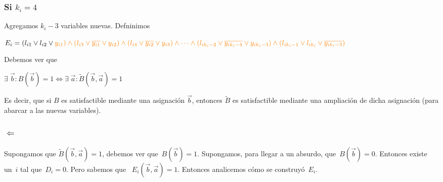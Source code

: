 \documentclass[10pt,a4paper]{article}
\begin{document}
\subsubsection*{Si $k_i = 4$}

Agregamos $k_i - 3$ variables nuevas. Defninimos

\begin{center}
$E_i = (l_{i1} \lor l_{i2}\lor \color{orange}{y_{i1}}) \land (l_{i3} \lor \color{orange}{\overline{y_{i1}}}\lor \color{orange}{y_{i2}}) \land (l_{i4} \lor \color{orange}{\overline{y_{i2}}}\lor \color{orange}{y_{i3}}) \land \dots \land (l_{ik_{i}-2} \lor \color{orange}{\overline{y_{ik_{i}-4}}}\lor \color{orange}{y_{ik_{i}-3}}) \land (l_{ik_{i}-1} \lor l_{ik_i}\lor \color{orange}{\overline{y_{ik_{i}-3}}})$
\end{center}

Debemos ver que

\begin{center}
$\exists \; \overrightarrow{b} :B(\overrightarrow{b}) = 1 \Leftrightarrow \exists \; \overrightarrow{a} : \tilde B(\overrightarrow{b}, \overrightarrow{a}) = 1$
\end{center}

Es decir, que si $B$ es satisfactible mediante una asignación $\overrightarrow{b} $, entonces $\tilde B$ es satisfactible mediante una ampliación de dicha asignación (para abarcar a las nuevas variables).

\subsubsection*{$\Leftarrow$}

Supongamos que $\tilde B(\overrightarrow{b} , \overrightarrow{a}) = 1 $, debemos ver que $B(\overrightarrow{b} ) = 1$. Supongamos, para llegar a un absurdo, que $B(\overrightarrow{b} ) = 0$. Entonces existe un $i$ tal que $D_i = 0$. Pero sabemos que  $E_i (\overrightarrow{b} , \overrightarrow{a}) = 1$. Entonces analicemos cómo se construyó $E_i$.
\end{document}
